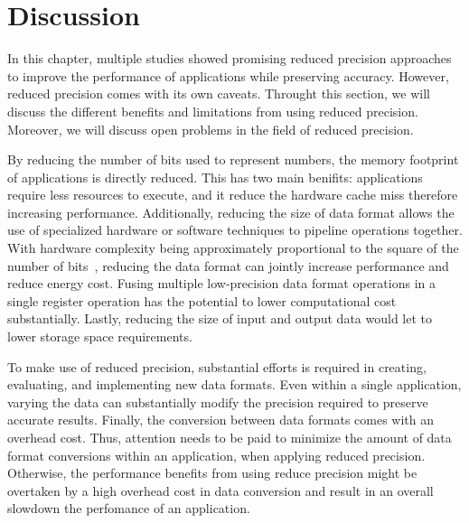 \section{Discussion}
\label{sc:reduced_precision_discussion}
In this chapter, multiple studies showed promising reduced precision approaches
to improve the performance of applications while preserving accuracy.
However, reduced precision comes with its own caveats.
Throught this section, we will discuss the different benefits and limitations from
using reduced precision.
Moreover, we will discuss open problems in the field of reduced precision.

By reducing the number of bits used to represent numbers, the memory footprint
of applications is directly reduced.
This has two main benifits: applications require less resources to execute, and 
it reduce the hardware cache miss therefore increasing performance.
Additionally, reducing the size of data format allows the use of specialized hardware
or software techniques to pipeline operations together.
With hardware complexity being approximately proportional to the square of the 
number of bits~\cite{Chen2018-an}, reducing the data format can jointly increase
performance and reduce energy cost.
Fusing multiple low-precision data format operations in a single register operation 
has the potential to lower computational cost substantially.
Lastly, reducing the size of input and output data would let to lower storage space requirements.

To make use of reduced precision, substantial efforts is required in creating, 
evaluating, and implementing new data formats.
Even within a single application, varying the data can substantially modify the 
precision required to preserve accurate results.
Finally, the conversion between data formats comes with an overhead cost.
Thus, attention needs to be paid to minimize the amount of data format conversions 
within an application, when applying reduced precision.
Otherwise, the performance benefits from using reduce precision might be overtaken
by a high overhead cost in data conversion and result in an overall slowdown 
the perfomance of an application.

